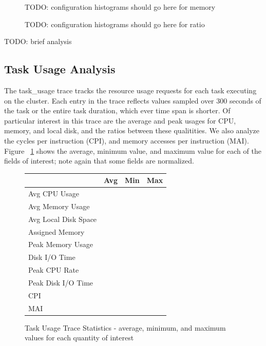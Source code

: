 \documentclass{sig-alternate}
\begin{document}
\begin{figure}
TODO: configuration histograms should go here for memory
\end{figure}

\begin{figure}
TODO: configuration histograms should go here for ratio
\end{figure}

TODO: brief analysis

\subsection{Task Usage Analysis}

The task\_usage trace tracks the resource usage requests for each task executing on the cluster.
Each entry in the trace reflects values sampled over 300 seconds of the task or the entire task duration, which ever time span is shorter.
Of particular interest in this trace are the average and peak usages for CPU, memory, and local disk, and the ratios between these qualitities.
We also analyze the cycles per instruction (CPI), and memory accesses per instruction (MAI).
Figure ~\ref{task_usage_stats} shows the average, minimum value, and maximum value for each of the fields of interest; note again that some fields are normalized.

\begin{figure}
\centering
\begin{tabular}{| p{2.5cm} | p{1.5cm} | p{1.5cm} | p{1.5cm} |} \hline
 & Avg & Min & Max \\ \hline
Avg CPU Usage & & & \\ \hline
Avg Memory Usage & & & \\ \hline
Avg Local Disk Space & & & \\ \hline
Assigned Memory & & & \\ \hline
Peak Memory Usage & & & \\ \hline
Disk I/O Time & & & \\ \hline
Peak CPU Rate & & & \\ \hline
Peak Disk I/O Time & & & \\ \hline
CPI & & & \\ \hline
MAI & & & \\ \hline
\end{tabular}
\caption{Task Usage Trace Statistics - average, minimum, and maximum values for each quantity of interest}
\label{task_usage_stats}
\end{figure}
\end{document}
